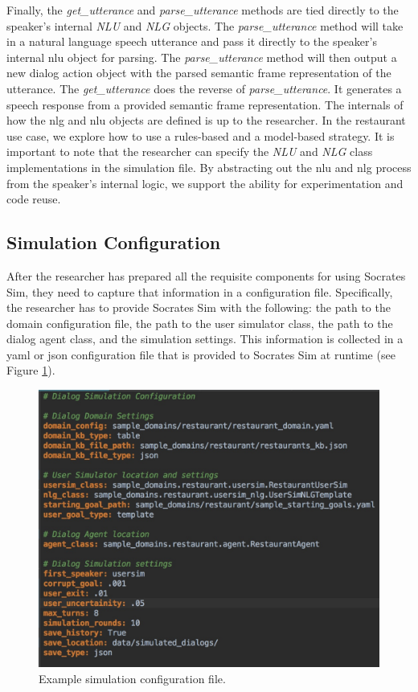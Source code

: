 Finally, the \textit{get\_utterance} and \textit{parse\_utterance} methods are tied directly to the speaker's internal \textit{NLU} and \textit{NLG} objects. The \textit{parse\_utterance} method will take in a natural language speech utterance and pass it directly to the speaker's internal nlu object for parsing. The \textit{parse\_utterance} method will then output a new dialog action object with the parsed semantic frame representation of the utterance. The \textit{get\_utterance} does the reverse of \textit{parse\_utterance}. It generates a speech response from a provided semantic frame representation. The internals of how the nlg and nlu objects are defined is up to the researcher. In the restaurant use case, we explore how to use a rules-based and a model-based strategy. It is important to note that the researcher can specify the \textit{NLU} and \textit{NLG} class implementations in the simulation file. By abstracting out the nlu and nlg process from the speaker's internal logic, we support the ability for experimentation and code reuse. 

\subsection{Simulation Configuration}
After the researcher has prepared all the requisite components for using Socrates Sim, they need to capture that information in a configuration file.  Specifically, the researcher has to provide Socrates Sim with the following: the path to the domain configuration file, the path to the user simulator class, the path to the dialog agent class, and the simulation settings. This information is collected in a yaml or json configuration file that is provided to Socrates Sim at runtime (see Figure \ref{fig:sample_sim_config}). 

\begin{figure}[h!]
	\centering
	\includegraphics[scale=.25]{diagrams/sample_sim_config.jpeg}
	\caption{ Example simulation configuration file. }
	\label{fig:sample_sim_config}
\end{figure}

